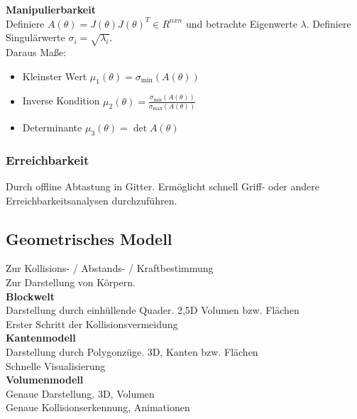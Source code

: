 \textbf{Manipulierbarkeit}\\
Definiere \(A(\theta) = J(\theta){J(\theta)}^T \in R^{nxn}\) und betrachte Eigenwerte \(\lambda\).
Definiere Singulärwerte \(\sigma_i = \sqrt{\lambda_i}\).\\
Daraus Maße:
\begin{itemize}
\item Kleinster Wert \(\mu_1 (\theta) = \sigma_{\min}(A(\theta))\)
\item Inverse Kondition \(\mu_2(\theta) = \frac{\sigma_{\min}(A(\theta))}{\sigma_{\max}(A(\theta))}\)
\item Determinante \(\mu_3(\theta) = \det A(\theta)\)
\end{itemize}

\subsubsection{Erreichbarkeit}
Durch offline Abtastung in Gitter. Ermöglicht schnell Griff- oder andere Erreichbarkeitsanalysen durchzuführen.

\subsection{Geometrisches Modell}
Zur Kollisions- / Abstands- / Kraftbestimmung\\
Zur Darstellung von Körpern.\\

\textbf{Blockwelt}\\
Darstellung durch einhüllende Quader. 2,5D Volumen bzw. Flächen\\
Erster Schritt der Kollisionsvermeidung\\

\textbf{Kantenmodell}\\
Darstellung durch Polygonzüge. 3D, Kanten bzw. Flächen\\
Schnelle Visualisierung\\

\textbf{Volumenmodell}\\
Genaue Darstellung. 3D, Volumen\\
Genaue Kollisionserkennung, Animationen